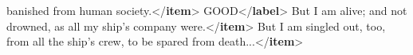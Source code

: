 \documentclass[11pt,twoside]{article}\makeatletter
\begin{document}
\begin{shaded}
\hspace*{1em}\hspace*{1em}\hspace*{1em}\hspace*{1em}\hspace*{1em}\hspace*{1em} banished from human society.{</\textbf{item}>}\mbox{}\newline 
\hspace*{1em}\mbox{}\newline 
{}\mbox{}\newline 
{}GOOD{</\textbf{label}>}\mbox{}\newline 
{}\mbox{}\newline 
\hspace*{1em}\mbox{}\newline 
\hspace*{1em}\hspace*{1em}But I am alive; and not drowned, as all my\mbox{}\newline 
\hspace*{1em}\hspace*{1em}\hspace*{1em}\hspace*{1em}\hspace*{1em}\hspace*{1em} ship's company were.{</\textbf{item}>}\mbox{}\newline 
\hspace*{1em}\hspace*{1em}But I am singled out, too, from all the ship's\mbox{}\newline 
\hspace*{1em}\hspace*{1em}\hspace*{1em}\hspace*{1em}\hspace*{1em}\hspace*{1em} crew, to be spared from death...{</\textbf{item}>}\mbox{}\newline 

\end{shaded}
\end{document}
